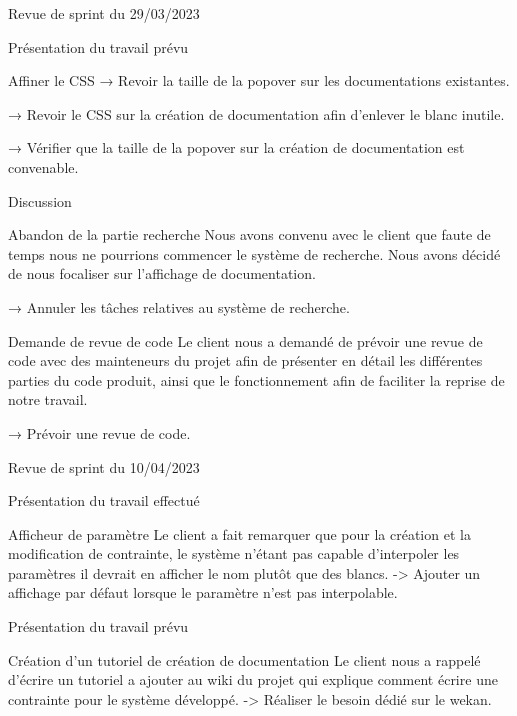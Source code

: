\documentclass[]{article}
\begin{document}
{\begin{section}{Revue de sprint du 29/03/2023}
\begin{subsection}{Présentation du travail prévu}
\begin{subsubsection}{Affiner le CSS}
         → Revoir la taille de la popover sur les documentations existantes.

         → Revoir le CSS sur la création de documentation afin d’enlever le blanc inutile.

         → Vérifier que la taille de la popover sur la création de documentation est convenable.
     \end{subsubsection}
 \end{subsection}

 \begin{subsection}{Discussion}
     \begin{subsubsection}{Abandon de la partie recherche}
         Nous avons convenu avec le client que faute de temps nous ne pourrions commencer le système de recherche. Nous avons décidé de nous focaliser sur l’affichage de documentation.

         → Annuler les tâches relatives au système de recherche.
     \end{subsubsection}

     \begin{subsubsection}{Demande de revue de code}
         Le client nous a demandé de prévoir une revue de code avec des mainteneurs du projet afin de présenter en détail les différentes parties du code produit, ainsi que le fonctionnement afin de faciliter la reprise de notre travail.

         → Prévoir une revue de code.
     \end{subsubsection}
 \end{subsection}
\end{section}

\begin{section}{Revue de sprint du 10/04/2023}
    \begin{subsection}{Présentation du travail effectué}
        \begin{subsubsection}{Afficheur de paramètre}
            Le client a fait remarquer que pour la création et la modification de contrainte, le système n'étant pas capable d'interpoler les paramètres il devrait en afficher le nom plutôt que des blancs.
            -> Ajouter un affichage par défaut lorsque le paramètre n'est pas interpolable.
        \end{subsubsection}
    \end{subsection}
   
    \begin{subsection}{Présentation du travail prévu}
        \begin{subsubsection}{Création d'un tutoriel de création de documentation}
            Le client nous a rappelé d'écrire un tutoriel a ajouter au wiki du projet qui explique comment écrire une contrainte pour le système développé.
            -> Réaliser le besoin dédié sur le wekan.
        \end{subsubsection}
    \end{subsection}
   \end{section}
}
\end{document}
